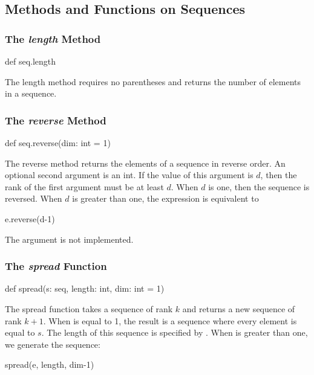 \subsection{Methods and Functions on Sequences}
\label{Methods_and_Functions_on_Sequences}

\subsubsection{The {\em length} Method}
\label{The_em_length_Method}

\begin{chapel}
def seq.length
\end{chapel}

The length method requires no parentheses and returns the number of
elements in a sequence.

\subsubsection{The {\em reverse} Method}
\label{The_em_reverse_Method}

\begin{chapel}
def seq.reverse(dim: int = 1)
\end{chapel}

The reverse method returns the elements of a sequence in reverse
order.  An optional second argument is an int. If the value of this
argument is $d$, then the rank of the first argument must be at least
$d$. When $d$ is one, then the sequence is reversed. When $d$ is
greater than one, the expression  is equivalent to
\begin{chapel}
[e in s] e.reverse(d-1)
\end{chapel}

\begin{status}
The  argument is not implemented.
\end{status}

\subsubsection{The {\em spread} Function}
\label{The_em_spread_Function}

\begin{chapel}
def spread(s: seq, length: int, dim: int = 1)
\end{chapel}

The spread function takes a sequence of rank $k$ and returns a new
sequence of rank $k+1$.  When  is equal to 1, the result is
a sequence where every element is equal to $s$.  The length of this
sequence is specified by .  When  is greater
than one, we generate the sequence:
\begin{chapel}
[e in s] spread(e, length, dim-1)
\end{chapel}

